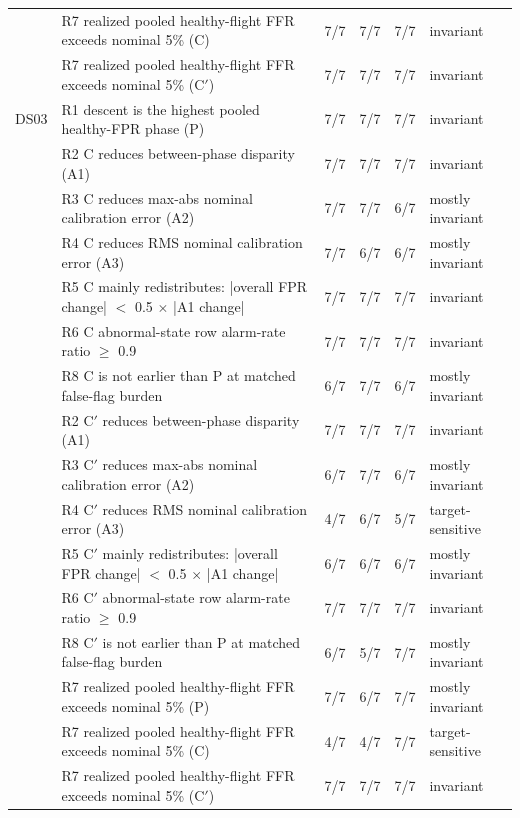 \begin{scriptsize}
\begin{longtable}{lp{}rrrl}
 & R7 realized pooled healthy-flight FFR exceeds nominal 5\% (C) & 7/7 & 7/7 & 7/7 & invariant \\
 & R7 realized pooled healthy-flight FFR exceeds nominal 5\% (C$'$) & 7/7 & 7/7 & 7/7 & invariant \\
\midrule
DS03 & R1 descent is the highest pooled healthy-FPR phase (P) & 7/7 & 7/7 & 7/7 & invariant \\
 & R2 C reduces between-phase disparity (A1) & 7/7 & 7/7 & 7/7 & invariant \\
 & R3 C reduces max-abs nominal calibration error (A2) & 7/7 & 7/7 & 6/7 & mostly invariant \\
 & R4 C reduces RMS nominal calibration error (A3) & 7/7 & 6/7 & 6/7 & mostly invariant \\
 & R5 C mainly redistributes: |overall FPR change| $<$ 0.5 $\times$ |A1 change| & 7/7 & 7/7 & 7/7 & invariant \\
 & R6 C abnormal-state row alarm-rate ratio $\geq$ 0.9 & 7/7 & 7/7 & 7/7 & invariant \\
 & R8 C is not earlier than P at matched false-flag burden & 6/7 & 7/7 & 6/7 & mostly invariant \\
 & R2 C$'$ reduces between-phase disparity (A1) & 7/7 & 7/7 & 7/7 & invariant \\
 & R3 C$'$ reduces max-abs nominal calibration error (A2) & 6/7 & 7/7 & 6/7 & mostly invariant \\
 & R4 C$'$ reduces RMS nominal calibration error (A3) & 4/7 & 6/7 & 5/7 & target-sensitive \\
 & R5 C$'$ mainly redistributes: |overall FPR change| $<$ 0.5 $\times$ |A1 change| & 6/7 & 6/7 & 6/7 & mostly invariant \\
 & R6 C$'$ abnormal-state row alarm-rate ratio $\geq$ 0.9 & 7/7 & 7/7 & 7/7 & invariant \\
 & R8 C$'$ is not earlier than P at matched false-flag burden & 6/7 & 5/7 & 7/7 & mostly invariant \\
 & R7 realized pooled healthy-flight FFR exceeds nominal 5\% (P) & 7/7 & 6/7 & 7/7 & mostly invariant \\
 & R7 realized pooled healthy-flight FFR exceeds nominal 5\% (C) & 4/7 & 4/7 & 7/7 & target-sensitive \\
 & R7 realized pooled healthy-flight FFR exceeds nominal 5\% (C$'$) & 7/7 & 7/7 & 7/7 & invariant \\
\end{longtable}
\end{scriptsize}
